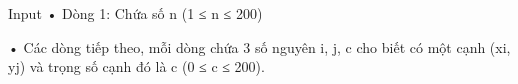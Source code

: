 Input
• Dòng 1: Chứa số n (1 ≤ n ≤ 200)   


   • Các dòng tiếp theo, mỗi dòng chứa 3 số nguyên i, j, c cho biết có một cạnh (xi, yj) và trọng số cạnh đó là c (0 ≤ c ≤ 200).